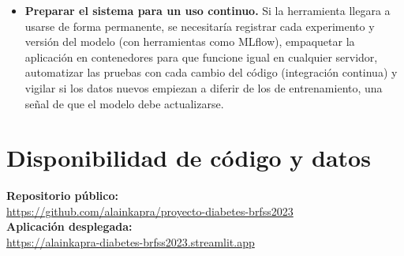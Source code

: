 \documentclass[conference,a4paper]{IEEEtran}
\begin{document}
\begin{itemize}
\item \textbf{Preparar el sistema para un uso continuo.} Si la herramienta llegara a usarse de forma permanente, se necesitaría registrar cada experimento y versión del modelo (con herramientas como MLflow), empaquetar la aplicación en contenedores para que funcione igual en cualquier servidor, automatizar las pruebas con cada cambio del código (integración continua) y vigilar si los datos nuevos empiezan a diferir de los de entrenamiento, una señal de que el modelo debe actualizarse.
\end{itemize}

\section*{Disponibilidad de código y datos}
\begin{flushleft}
\textbf{Repositorio público:}\\
\url{https://github.com/alainkapra/proyecto-diabetes-brfss2023}\\[3pt]
\textbf{Aplicación desplegada:}\\
\url{https://alainkapra-diabetes-brfss2023.streamlit.app}\\[3pt]


\end{flushleft}
\end{document}
